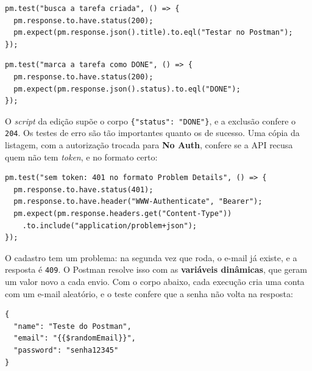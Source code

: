 \begin{codigo}
\begin{Verbatim}[breaklines=true, breaksymbolleft={}, fontsize=\footnotesize]
pm.test("busca a tarefa criada", () => {
  pm.response.to.have.status(200);
  pm.expect(pm.response.json().title).to.eql("Testar no Postman");
});
\end{Verbatim}
\end{codigo}

\begin{codigo}
\begin{Verbatim}[breaklines=true, breaksymbolleft={}, fontsize=\footnotesize]
pm.test("marca a tarefa como DONE", () => {
  pm.response.to.have.status(200);
  pm.expect(pm.response.json().status).to.eql("DONE");
});
\end{Verbatim}
\end{codigo}

O \textit{script} da edição supõe o corpo \texttt{\{"status": "DONE"\}}, e a exclusão confere o \texttt{204}. Os testes de erro são tão importantes quanto os de sucesso. Uma cópia da listagem, com a autorização trocada para \textbf{No Auth}, confere se a API recusa quem não tem \textit{token}, e no formato certo:

\begin{codigo}
\begin{Verbatim}[breaklines=true, breaksymbolleft={}, fontsize=\footnotesize]
pm.test("sem token: 401 no formato Problem Details", () => {
  pm.response.to.have.status(401);
  pm.response.to.have.header("WWW-Authenticate", "Bearer");
  pm.expect(pm.response.headers.get("Content-Type"))
    .to.include("application/problem+json");
});
\end{Verbatim}
\end{codigo}

O cadastro tem um problema: na segunda vez que roda, o e-mail já existe, e a resposta é \texttt{409}. O Postman resolve isso com as \textbf{variáveis dinâmicas}, que geram um valor novo a cada envio. Com o corpo abaixo, cada execução cria uma conta com um e-mail aleatório, e o teste confere que a senha não volta na resposta:

\begin{codigo}
\begin{Verbatim}[breaklines=true, breaksymbolleft={}, fontsize=\footnotesize]
{
  "name": "Teste do Postman",
  "email": "{{$randomEmail}}",
  "password": "senha12345"
}
\end{Verbatim}
\end{codigo}

